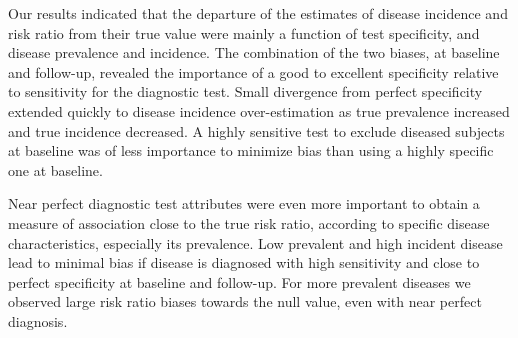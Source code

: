 Our results indicated that the departure of the estimates of disease incidence
and risk ratio from their true value were mainly a function of test
specificity, and disease prevalence and incidence.
The combination of the two biases, at baseline and follow-up, revealed the
importance of a good to excellent specificity relative to sensitivity for the
diagnostic test.
Small divergence from perfect specificity extended quickly to disease
incidence over-estimation as true prevalence increased and true incidence
decreased.
A highly sensitive test to exclude diseased subjects at baseline was of less
importance to minimize bias than using a highly specific one at baseline.

Near perfect diagnostic test attributes were even more important to obtain a
measure of association close to the true risk ratio, according to specific
disease characteristics, especially its prevalence.
Low prevalent and high incident disease lead to minimal bias if disease is
diagnosed with high sensitivity and close to perfect specificity at baseline and
follow-up.
For more prevalent diseases we observed large risk ratio biases towards the
null value, even with near perfect diagnosis.
  
